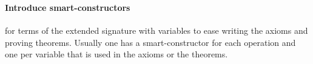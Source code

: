 \begin{code}
\AgdaSymbol{;}\AgdaSpace{}%
\AgdaSpace{}%
\AgdaSymbol{=}\AgdaSpace{}%
\AgdaSpace{}%
\AgdaSymbol{\}}\<%
\\
%
\\[\AgdaEmptyExtraSkip]%
%
\>[0]\AgdaSpace{}%
\AgdaSymbol{:}\AgdaSpace{}%
\AgdaSpace{}%
\<%
\\
%
\>[0]\AgdaSpace{}%
\AgdaSpace{}%
\AgdaSymbol{=}\AgdaSpace{}%
\<%
\\
%
\\[\AgdaEmptyExtraSkip]%
%
\>[0]\AgdaSpace{}%
\AgdaSymbol{:}\AgdaSpace{}%
\<%
\\
%
\>[0]\AgdaSpace{}%
\AgdaSymbol{=}\AgdaSpace{}%
\AgdaSpace{}%
\AgdaSpace{}%
\AgdaSpace{}%
\<%
\\
\end{code}
  
\paragraph*{Introduce smart-constructors}
\label{sec:intr-smart-constr}
  for terms of the extended
  signature with variables to ease writing the axioms and proving
  theorems. Usually one has a smart-constructor for each operation and
  one per variable that is used in the axioms or the theorems.

